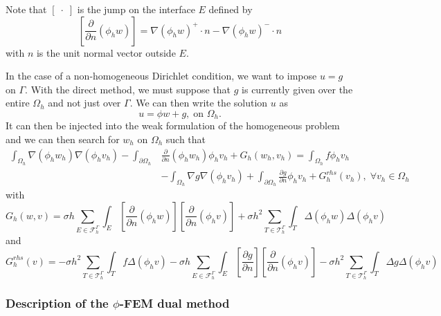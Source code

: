 \begin{Rem}
	Note that $[\;\cdot\;]$ is the jump on the interface $E$ defined by
	\begin{equation*}
		\left[\frac{\partial}{\partial n}(\phi_h w)\right]=\nabla(\phi_h w)^+\cdot n - \nabla(\phi_h w)^-\cdot n
	\end{equation*}
with $n$ is the unit normal vector outside $E$.
\end{Rem}

In the case of a non-homogeneous Dirichlet condition, we want to impose $u=g$ on $\Gamma$. With the direct method, we must suppose that $g$ is currently given over the entire $\Omega_h$ and not just over $\Gamma$. We can then write the solution $u$ as
\begin{equation*}
	u=\phi w +g, \; \text{on } \Omega_h.
\end{equation*}
It can then be injected into the weak formulation of the homogeneous problem and we can then search for $w_h$ on $\Omega_h$ such that
\begin{align*}
	\int_{\Omega_h}\nabla(\phi_h w_h)\nabla(\phi_h v_h)-\int_{\partial\Omega_h}&\frac{\partial}{\partial n}(\phi_h w_h)\phi_h v_h+G_h(w_h,v_h)=\int_{\Omega_h}f\phi_h v_h \\
	&-\int_{\Omega_h}\nabla g\nabla(\phi_h v_h)+\int_{\partial\Omega_h}\frac{\partial g}{\partial n}\phi_h v_h+G_h^{rhs}(v_h), \; \forall v_h\in \Omega_h
\end{align*}
with
\begin{equation*}
	G_h(w,v)=\sigma h\sum_{E\in\mathcal{F}_h^\Gamma}\int_E\left[\frac{\partial}{\partial n}(\phi_h w)\right]\left[\frac{\partial}{\partial n}(\phi_h v)\right]+\sigma h^2\sum_{T\in\mathcal{T}_h^\Gamma}\int_T \Delta(\phi_h w)\Delta(\phi_h v)
\end{equation*}
and
\begin{equation*}
	G_h^{rhs}(v)=-\sigma h^2\sum_{T\in\mathcal{T}_h^\Gamma}\int_T f\Delta(\phi_h v)-\sigma h\sum_{E\in\mathcal{F}_h^\Gamma}\int_E\left[\frac{\partial g}{\partial n}\right]\left[\frac{\partial}{\partial n}(\phi_h v)\right]-\sigma h^2\sum_{T\in\mathcal{T}_h^\Gamma}\int_T \Delta g\Delta(\phi_h v)
\end{equation*}

\subsubsection{Description of the $\phi$-FEM dual method} \label{FEMs.PhiFEM.dual_method}

